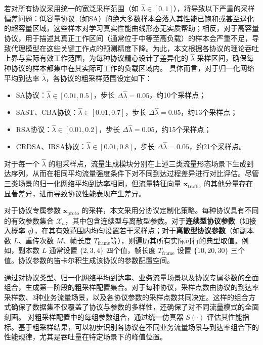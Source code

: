 若对所有协议采用统一的宽泛采样范围（如 $\hat{\lambda} \in [0, 1]$），将导致以下严重的采样偏差问题：低容量协议（如SA）的绝大多数样本会落入其性能已饱和或甚至退化的超容量区域，这些样本对学习真实性能曲线形态无实质帮助；相反，对于高容量协议，用于描述其真正工作区间（通常位于中等至高负载）的样本会严重不足，导致代理模型在这些关键工作点的预测精度下降。为此，本文根据各协议的理论吞吐上界与实际有效工作范围，为每种协议精心设计了差异化的 $\hat{\lambda}$ 采样区间，确保每种协议的样本都集中在其实际可工作的负载区域内。
具体而言，对于归一化网络平均到达率 $\hat{\lambda}$，各协议的粗采样范围设定如下：
\begin{itemize}[leftmargin=*]
	\item SA协议：$\hat{\lambda} \in [0.01, 0.5]$，步长 $\Delta\hat{\lambda} = 0.05$，约10个采样点；
	\item SAST、CBA协议：$\hat{\lambda} \in [0.01, 0.7]$，步长 $\Delta\hat{\lambda} = 0.05$，约13个采样点；
	\item RSA协议：$\hat{\lambda} \in [0.01, 0.2]$，步长 $\Delta\hat{\lambda} = 0.05$，约15个采样点；
	\item CRDSA、IRSA协议：$\hat{\lambda} \in [0.01, 0.8]$，步长 $\Delta\hat{\lambda} = 0.05$，约21个采样点。
\end{itemize}

对于每一个 $\hat{\lambda}$ 的粗采样点，流量生成模块分别在上述三类流量形态场景下生成到达序列，从而在相同平均流量强度条件下对不同到达过程差异进行对比评估。尽管三类场景的归一化网络平均到达率相同，但流量特征向量 $\mathbf{x}_{\text{traffic}}$ 的其他分量存在显著差异，进而导致协议性能表现产生差异。

对于协议专属参数 $\mathbf{x}_{\mathrm{proto}}$ 的采样，本文采用分协议定制化策略。每种协议具有不同的有效参数集合 $\mathcal{X}_a$，其中包含连续型与离散型参数。对于\textbf{连续型协议参数}（如接入概率 $q$），在其有效范围内均匀设置若干采样点；对于\textbf{离散型协议参数}（如副本数 $L$、重传次数 $M$、帧长度 $T_{\mathrm{frame}}$等），则遍历其所有实际可行的典型取值。例如，副本数 $L$ 通常设置 $\{2, 3, 4 \}$ 四个值，帧长度 $T_{\mathrm{frame}}$ 设置 $\{10, 20, 30\}$ 三个值。协议参数的笛卡尔积生成该协议的参数配置空间。

通过对协议类型、归一化网络平均到达率、业务流量场景以及协议专属参数的全面组合，生成第一阶段的粗采样配置集合。对于每种协议，采样点数由协议的到达率采样数、3种业务流量场景，以及各协议参数的采样点数共同决定。这样的组合方式确保了数据集不仅覆盖了协议与参数的多样性，还确保了对不同流量模式的全面刻画。
对粗采样配置中的每组参数组合，通过统一仿真器 $S(\cdot)$ 评估其性能指标。基于粗采样结果，可以初步识别各协议在不同业务流量场景与到达率组合下的性能规律，尤其是吞吐量在特定场景下的峰值位置。

